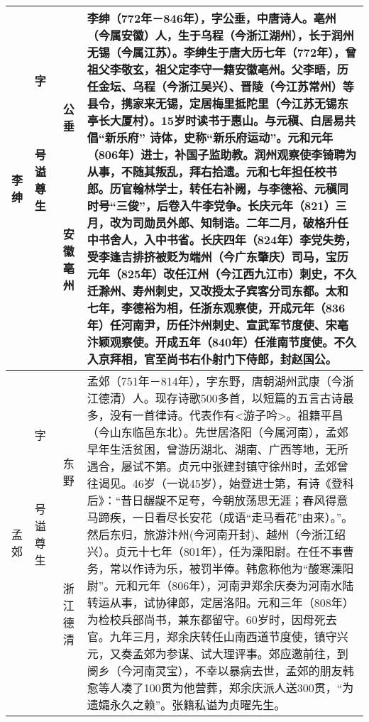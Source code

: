 \begin{longtable}{|>{\centering\namefont\heiti}m{2em}|>{\centering\tiny}m{3.0em}|>{\xzfont\kaiti}m{7em}|}
  李绅 & \begin{description}
  \item[字] 公垂
  \item[号] 
  \item[谥] 
  \item[尊] 
  \item[生] 安徽亳州
  \end{description} & 李绅（772年－846年），字公垂，中唐诗人。亳州（今属安徽）人，生于乌程（今浙江湖州），长于润州无锡（今属江苏）。李绅生于唐大历七年（772年），曾祖父李敬玄，祖父定李守一籍安徽亳州。父李晤，历任金坛、乌程（今浙江吴兴）、晋陵（今江苏常州）等县令，携家来无锡，定居梅里抵陀里（今江苏无锡东亭长大厦村）。15岁时读书于惠山。与元稹、白居易共倡“新乐府” 诗体，史称“新乐府运动”。元和元年（806年）进士，补国子监助教。润州观察使李锜聘为从事，不随其叛乱，拜右拾遗。元和七年担任校书郎。历官翰林学士，转任右补阙，与李德裕、元稹同时号“三俊”，后卷入牛李党争。长庆元年（821）三月，改为司勋员外郎、知制诰。二年二月，破格升任中书舍人，入中书省。长庆四年（824年）李党失势，受李逢吉排挤被贬为端州（今广东肇庆）司马，宝历元年（825年）改任江州（今江西九江市）刺史，不久迁滁州、寿州刺史，又改授太子宾客分司东都。太和七年，李德裕为相，任浙东观察使，开成元年（836年）任河南尹，历任汴州刺史、宣武军节度使、宋亳汴颖观察使。开成五年（840年）任淮南节度使。不久入京拜相，官至尚书右仆射门下侍郎，封赵国公。 \tabularnewline\hline
  孟郊 & \begin{description}
  \item[字] 东野
  \item[号] 
  \item[谥] 
  \item[尊] 
  \item[生] 浙江德清
  \end{description} & 孟郊（751年－814年），字东野，唐朝湖州武康（今浙江德清）人。现存诗歌500多首，以短篇的五言古诗最多，没有一首律诗。代表作有<游子吟>。祖籍平昌（今山东临邑东北）。先世居洛阳（今属河南），孟郊早年生活贫困，曾游历湖北、湖南、广西等地，无所遇合，屡试不第。贞元中张建封镇守徐州时，孟郊曾往谒见。46岁（一说45岁），始登进士第，有诗《登科后》：“昔日龌龊不足夸，今朝放荡思无涯；春风得意马蹄疾，一日看尽长安花（成语“走马看花”由来）。”。然后东归，旅游汴州(今河南开封)、越州（今浙江绍兴）。贞元十七年（801年），任为溧阳尉。在任不事曹务，常以作诗为乐，被罚半俸。韩愈称他为“酸寒溧阳尉”。元和元年（806年），河南尹郑余庆奏为河南水陆转运从事，试协律郎，定居洛阳。元和三年（808年）为检校兵部尚书，兼东都留守。60岁时，因母死去官。九年三月，郑余庆转任山南西道节度使，镇守兴元，又奏孟郊为参谋、试大理评事。郊应邀前往，到阌乡（今河南灵宝），不幸以暴病去世，孟郊的朋友韩愈等人凑了100贯为他营葬，郑余庆派人送300贯，“为遗孀永久之赖”。张籍私谥为贞曜先生。 \tabularnewline\hline

\end{longtable}
